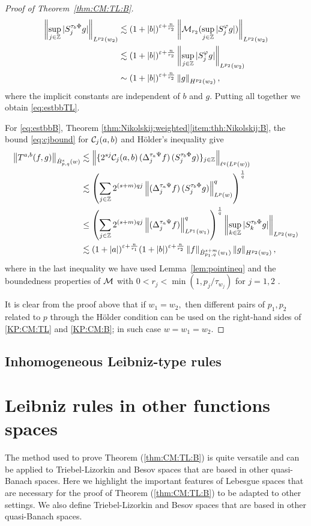 \begin{proof}[Proof of Theorem~\ref{thm:CM:TL:B}]
\begin{align*}
\left\|\sup_{j\in\mathbb{Z}}|S^{\tau_b\Phi}_{j}g|\right\|_{L^{p_2}(w_2)}&\lesssim (1+\left\vert b \right\vert)^{\varepsilon+\frac{n}{r_2}} \left\|\mathcal{M}_{r_2}(\sup_{j\in\mathbb{Z}}|S^{\varphi}_{j}g|)\right\|_{L^{p_2}(w_2)}\\
&\lesssim (1+\left\vert b \right\vert)^{\varepsilon+\frac{n}{r_2}} \left\|\sup_{j\in\mathbb{Z}}|S^{\varphi}_{j}g|\right\|_{L^{p_2}(w_2)}\\
&\sim (1+\left\vert b \right\vert)^{\varepsilon+\frac{n}{r_2}} \left\|g\right\|_{H^{p_2}(w_2)},
\end{align*}
where the implicit constants are independent of $b$ and $g.$ Putting all together we obtain \eqref{eq:estbbTL}.


For \eqref{eq:estbbB},  Theorem \ref{thm:Nikolskij:weighted}\eqref{item:thh:Nikolskij:B}, the bound \eqref{eq:cjbound} for $\mathcal{C}_j(a,b)$ and H\"older's inequality  give
\begin{align*}
\left\|T^{a,b}(f,g)\right\|_{\dot{B}^s_{p,q}(w)} & \lesssim \left\|\{2^{sj} \mathcal{C}_j(a,b) \,(\Delta^{ \tau_a \Psi }_{j} f ) \, (S^{ \tau_b \Phi }_{j} g)\}_{j\in\mathbb{Z}} \right\|_{\ell^q(L^p(w))}\\
& \lesssim \left(\sum\limits_{j \in \mathbb{Z}}  2^{(s +m) q j}  \left\|(\Delta^{ \tau_a \Psi }_{j} f ) \, (S^{ \tau_b \Phi }_{j} g)\right\|_{L^p(w)}^q   \right)^\frac{1}{q}  \\
&\le  \left(\sum\limits_{j \in \mathbb{Z}}  2^{(s +m) q j}  \left\|(\Delta^{ \tau_a \Psi }_{j} f ) \right\|_{L^{p_1}(w_1)}^q   \right)^\frac{1}{q}  \left\|\sup_{k\in \mathbb{Z}}|S^{ \tau_b \Phi }_{k} g|\right\|_{L^{p_2}(w_2)}\\
& \lesssim  (1+\left\vert a \right\vert)^{\varepsilon+\frac{n}{r_1}}  (1+\left\vert b \right\vert)^{\varepsilon+\frac{n}{r_2}}  \left\|f\right\|_{\dot{B}^{s+m}_{p_1, q}(w_1)} \left\|g\right\|_{H^{p_2}(w_2)},
\end{align*}
where in the last inequality we have used Lemma~\ref{lem:pointineq} and the boundedness properties of $\mathcal{M}$ with  $0<r_j<\min(1,p_j/\tau_{w_j})$ for $j=1,2$ .


It is clear from the proof above that if $w_1=w_2,$ then  different pairs of $p_1, p_2$ related to $p$ through the H\"older condition can be used on the right-hand sides of \eqref{KP:CM:TL} and \eqref{KP:CM:B}; in such case $w=w_1=w_2.$  
\end{proof}

 \subsection{Inhomogeneous Leibniz-type rules}
 
 \section{Leibniz rules in other functions spaces}
 The method used to prove Theorem (\ref{thm:CM:TL:B}) is quite versatile and can be applied to Triebel-Lizorkin and Besov spaces that are based in other quasi-Banach spaces. Here we highlight the important features of Lebesgue spaces that are necessary for the proof of Theorem (\ref{thm:CM:TL:B}) to be adapted to other settings. We also define Triebel-Lizorkin and Besov spaces that are based in other quasi-Banach spaces. 
 
